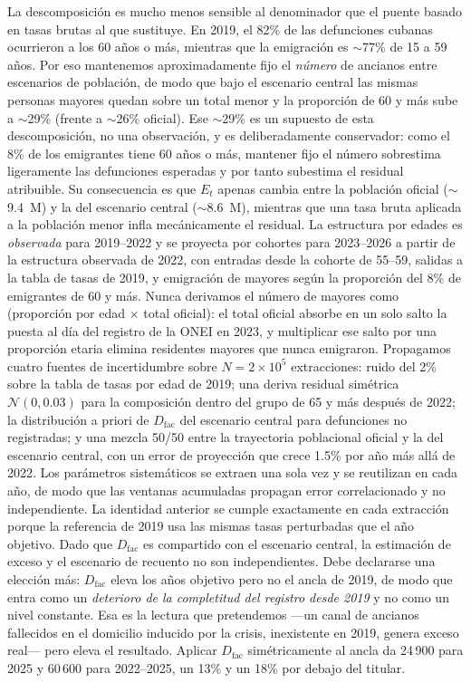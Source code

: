 \documentclass[11pt,a4paper]{article}
\begin{document}
La descomposición es mucho menos sensible al denominador que el puente basado en tasas brutas al que sustituye.
En 2019, el 82\% de las defunciones cubanas ocurrieron a los 60 años o más, mientras que la emigración es $\sim$77\% de 15 a 59 años.
Por eso mantenemos aproximadamente fijo el \emph{número} de ancianos entre escenarios de población, de modo que bajo el escenario central las mismas personas mayores quedan sobre un total menor y la proporción de 60 y más sube a $\sim$29\% (frente a $\sim$26\% oficial).
Ese $\sim$29\% es un supuesto de esta descomposición, no una observación, y es deliberadamente conservador: como el 8\% de los emigrantes tiene 60 años o más, mantener fijo el número sobrestima ligeramente las defunciones esperadas y por tanto subestima el residual atribuible.
Su consecuencia es que $E_t$ apenas cambia entre la población oficial ($\sim$9.4~M) y la del escenario central ($\sim$8.6~M), mientras que una tasa bruta aplicada a la población menor infla mecánicamente el residual.
La estructura por edades es \emph{observada} para 2019--2022 y se proyecta por cohortes para 2023--2026 a partir de la estructura observada de 2022, con entradas desde la cohorte de 55--59, salidas a la tabla de tasas de 2019, y emigración de mayores según la proporción del 8\% de emigrantes de 60 y más.
Nunca derivamos el número de mayores como (proporción por edad $\times$ total oficial): el total oficial absorbe en un solo salto la puesta al día del registro de la ONEI en 2023, y multiplicar ese salto por una proporción etaria elimina residentes mayores que nunca emigraron.
Propagamos cuatro fuentes de incertidumbre sobre $N=2\times10^5$ extracciones: ruido del 2\% sobre la tabla de tasas por edad de 2019; una deriva residual simétrica $\mathcal{N}(0,0.03)$ para la composición dentro del grupo de 65 y más después de 2022; la distribución a priori de $D_{\mathrm{fac}}$ del escenario central para defunciones no registradas; y una mezcla 50/50 entre la trayectoria poblacional oficial y la del escenario central, con un error de proyección que crece 1.5\% por año más allá de 2022.
Los parámetros sistemáticos se extraen una sola vez y se reutilizan en cada año, de modo que las ventanas acumuladas propagan error correlacionado y no independiente.
La identidad anterior se cumple exactamente en cada extracción porque la referencia de 2019 usa las mismas tasas perturbadas que el año objetivo.
Dado que $D_{\mathrm{fac}}$ es compartido con el escenario central, la estimación de exceso y el escenario de recuento no son independientes.
Debe declararse una elección más: $D_{\mathrm{fac}}$ eleva los años objetivo pero no el ancla de 2019, de modo que entra como un \emph{deterioro de la completitud del registro desde 2019} y no como un nivel constante. Esa es la lectura que pretendemos ---un canal de ancianos fallecidos en el domicilio inducido por la crisis, inexistente en 2019, genera exceso real--- pero eleva el resultado. Aplicar $D_{\mathrm{fac}}$ simétricamente al ancla da 24\,900 para 2025 y 60\,600 para 2022--2025, un 13\% y un 18\% por debajo del titular.
\end{document}
